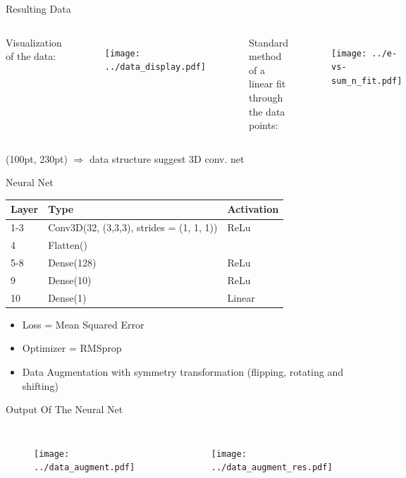 \documentclass[10pt]{beamer}
\begin{document}
\begin{frame}{Resulting Data}
  \begin{columns}
    Visualization of the data:
    \begin{figure}[htp]
      \texttt{[image: ../data\_display.pdf]}
    \end{figure}
    Standard method of a linear fit through the data points:
    \begin{figure}[htp]
      \texttt{[image: ../e-vs-sum\_n\_fit.pdf]}
    \end{figure}
  \end{columns}
  \begin{textblock*}{250pt}(100pt, 230pt)
    $\Rightarrow$ data structure suggest 3D conv. net
  \end{textblock*}
\end{frame}

\begin{frame}{Neural Net}
  \centering
  \begin{tabular}{l|l|l}
    Layer & Type                                & Activation \\ \hline
    1-3     & Conv3D(32, (3,3,3), strides = (1, 1, 1)) & ReLu       \\
    4     & Flatten()                           &            \\
    5-8   & Dense(128)                          & ReLu       \\
    9     & Dense(10)                           & ReLu       \\
    10     & Dense(1)                            & Linear    
  \end{tabular}
  \begin{itemize}
  \item Loss = Mean Squared Error
  \item Optimizer = RMSprop
  \item Data Augmentation with symmetry transformation (flipping, rotating and shifting)
  \end{itemize}
\end{frame}

\begin{frame}{Output Of The Neural Net}
  \begin{columns}
    \begin{figure}[htp]
      \texttt{[image: ../data\_augment.pdf]}
    \end{figure}
    \begin{figure}[htp]
      \texttt{[image: ../data\_augment\_res.pdf]}
    \end{figure}
  \end{columns}
\end{frame}
\end{document}

